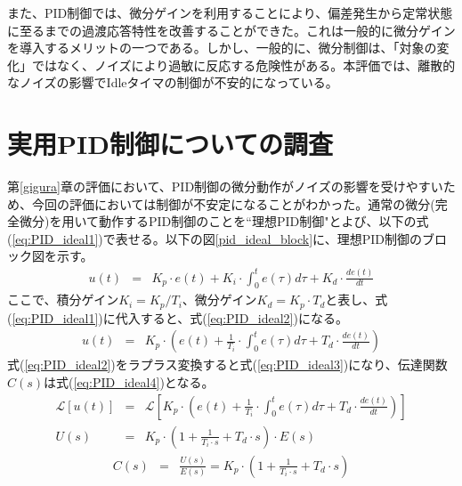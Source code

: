 \documentclass[a4j]{ujarticle}
\begin{document}
また、PID制御では、微分ゲインを利用することにより、偏差発生から定常状態に至るまでの過渡応答特性を改善することができた。これは一般的に微分ゲインを導入するメリットの一つである。しかし、一般的に、微分制御は、「対象の変化」ではなく、ノイズにより過敏に反応する危険性がある。本評価では、離散的なノイズの影響でIdleタイマの制御が不安的になっている。

\clearpage
\section{実用PID制御についての調査}
第\ref{gigura}章の評価において、PID制御の微分動作がノイズの影響を受けやすいため、今回の評価においては制御が不安定になることがわかった。通常の微分(完全微分)を用いて動作するPID制御のことを``理想PID制御"とよび、以下の式(\ref{eq:PID_ideal1})で表せる。以下の図\ref{pid_ideal_block}に、理想PID制御のブロック図を示す。
\begin{eqnarray}
  u(t) &=& K_p \cdot e(t) + K_i \cdot \int_0^t e(\tau) d\tau + K_d \cdot \frac{de(t)}{dt}
  \label{eq:PID_ideal1}
\end{eqnarray}
ここで、積分ゲイン$K_i = K_p / T_i$、微分ゲイン$K_d = K_p \cdot T_d$と表し、式(\ref{eq:PID_ideal1})に代入すると、式(\ref{eq:PID_ideal2})になる。
\begin{eqnarray}
  u(t) &=& K_p \cdot (e(t) + \frac{1}{T_i} \cdot \int_0^t e(\tau) d\tau +  T_d \cdot \frac{de(t)}{dt})
  \label{eq:PID_ideal2}
\end{eqnarray}
式(\ref{eq:PID_ideal2})をラプラス変換すると式(\ref{eq:PID_ideal3})になり、伝達関数$C(s)$は式(\ref{eq:PID_ideal4})となる。
\begin{eqnarray}
  \mathcal{L}[u(t)] &=& \mathcal{L}[K_p \cdot (e(t) + \frac{1}{T_i} \cdot \int_0^t e(\tau) d\tau +  T_d \cdot \frac{de(t)}{dt})] \nonumber\\
  U(s) &=& K_p \cdot (1 + \frac{1}{T_i \cdot s}  +  T_d \cdot s) \cdot E(s)
  \label{eq:PID_ideal3}
\end{eqnarray}
\begin{eqnarray}
  C(s) &=& \frac{U(s)}{E(s)} = K_p \cdot (1 + \frac{1}{T_i \cdot s}  +  T_d \cdot s)
  \label{eq:PID_ideal4}
\end{eqnarray}
\end{document}
